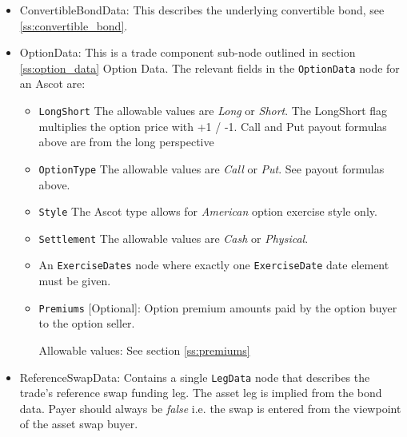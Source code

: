 \begin{itemize}
  \item ConvertibleBondData: This describes the underlying convertible bond, see \ref{ss:convertible_bond}. 
  \item OptionData: This is a trade component sub-node outlined in section \ref{ss:option_data} Option Data. The relevant fields in the \lstinline!OptionData! node for an Ascot are: 

\begin{itemize}

\item \lstinline!LongShort! The allowable values are \emph{Long} or \emph{Short}. The LongShort flag multiplies the option price with +1 / -1. Call and Put payout formulas above are from the long perspective 

\item \lstinline!OptionType! The allowable values are \emph{Call} or \emph{Put}. See payout formulas above.

\item  \lstinline!Style! The Ascot type allows for \emph{American} option exercise style only.

\item  \lstinline!Settlement! The allowable values are \emph{Cash} or \emph{Physical}.

\item An \lstinline!ExerciseDates! node where exactly one \lstinline!ExerciseDate! date element must be given.

\item \lstinline!Premiums! [Optional]: Option premium amounts paid by the option buyer to the option seller.

Allowable values:  See section \ref{ss:premiums}

\end{itemize}	
	
	
	
  \item ReferenceSwapData: Contains a single  \lstinline!LegData! node that describes the trade's reference swap funding leg. The asset leg is implied from the bond data. Payer should always be \emph{false}  i.e. the swap is entered from the viewpoint of the asset swap buyer.
\end{itemize}

